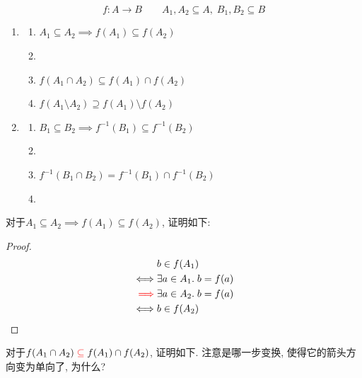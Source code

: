 \begin{theorem}
  \[
    f: A \to B \qquad
    {A_1, A_2 \subseteq A,\; B_1, B_2 \subseteq B}
  \]

  \begin{enumerate}
    \item {}
      \begin{enumerate}
        \item $A_1 \subseteq A_2 \implies f(A_1) \subseteq f(A_2)$
        \item {}
        \item $f(A_1 \cap A_2) \subseteq f(A_1) \cap f(A_2)$
        \item $f(A_1 \setminus A_2) \supseteq f(A_1) \setminus f(A_2)$
      \end{enumerate}
    \item {}\begin{enumerate}
      \item $B_1 \subseteq B_2 \implies f^{-1}(B_1) \subseteq f^{-1}(B_2)$
      \item {}
      \item $f^{-1}(B_1 \cap B_2) = f^{-1}(B_1) \cap f^{-1}(B_2)$
      \item {}
    \end{enumerate}
  \end{enumerate}
\end{theorem}

对于$A_1 \subseteq A_2 \implies f(A_1) \subseteq f(A_2)$, 证明如下: 

\begin{proof}
  \setcounter{equation}{0}
  \begin{align*}
    &b \in f(A_{1}) \\
    \iff & \exists a \in A_{1}.\; b = f(a) \\
    \textcolor{red}{\implies} & \exists a \in A_{2}.\; b = f(a) \\
    \iff & b \in f(A_{2})
  \end{align*}
\end{proof}

对于$f(A_1 \cap A_2) \textcolor{red}{\;\subseteq\;} f(A_1) \cap f(A_2)$, 证明如下. 注意是哪一步变换, 使得它的箭头方向变为单向了, 为什么? 

